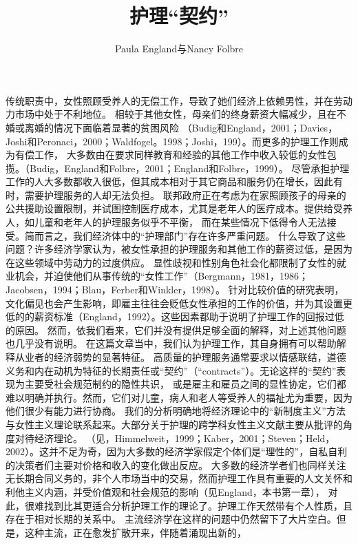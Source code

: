 \documentclass[UTF8]{ctexart}
\title{护理“契约”}
\author{Paula England与Nancy Folbre}
\begin{document}
\maketitle

传统职责中，女性照顾受养人的无偿工作，导致了她们经济上依赖男性，并在劳动力市场中处于不利地位。
相较于其他女性，母亲们的终身薪资大幅减少，且在不婚或离婚的情况下面临着显著的贫困风险
（Budig和Engl\newline and，2001；Davies，Joshi和Peronaci，2000；Waldfogel。1998；Joshi，199）。而更多的护理工作则成为有偿工作，
大多数由在要求同样教育和经验的其他工作中收入较低的女性包揽。（Budig，England和Folbre，2001；England和Folbre，1999）。
尽管承担护理工作的人大多数都收入很低，但其成本相对于其它商品和服务仍在增长，因此有时，需要护理服务的人却无法负担。
联邦政府正在考虑为在家照顾孩子的母亲的公共援助设置限制，并试图控制医疗成本，尤其是老年人的医疗成本。提供给受养人，如儿童和老年人的护理服务似乎不平衡，
而在某些情况下低得令人无法接受。简而言之，我们经济体中的“护理部门”存在许多严重问题。
什么导致了这些问题？许多经济学家认为，被女性承担的护理服务和其他工作的薪资过低，是因为在这些领域中劳动力的过度供应。
显性歧视和性别角色社会化都限制了女性的就业机会，并迫使他们从事传统的“女性工作”（Bergmann，1981，1986；Jacobsen，1994；Blau，Ferber和Winkler，1998）。
针对比较价值的研究表明，文化偏见也会产生影响，即雇主往往会贬低女性承担的工作的价值，并为其设置更低的的薪资标准（England，1992）。这些因素都助于说明了护理工作的回报过低的原因。
然而，依我们看来，它们并没有提供足够全面的解释，对上述其他问题也几乎没有说明。
在这篇文章当中，我们认为护理工作，其自身拥有可以帮助解释从业者的经济弱势的显著特征。
高质量的护理服务通常要求以情感联结，道德义务和内在动机为特征的长期责任或“契约”（“contracts”）。无论这样的“契约”表现为主要受社会规范制约的隐性共识，
或是雇主和雇员之间的显性协定，它们都难以明确并执行。然而，它们对儿童，病人和老人等受养人的福祉尤为重要，因为他们很少有能力进行协商。
我们的分析明确地将经济理论中的“新制度主义”方法与女性主义理论联系起来。大部分关于护理的跨学科女性主义文献主要从批评的角度对待经济理论。
（见，Himmelweit，1999；Kaber，2001；Steven；Held，2002）。这并不足为奇，因为大多数的经济学家假定个体们是“理性的”，自私自利的决策者们主要对价格和收入的变化做出反应。
大多数的经济学者们也同样关注无长期合同义务的，非个人市场当中的交易，然而护理工作具有重要的人文关怀和利他主义内涵，并受价值观和社会规范的影响（见England，本书第一章），
对此，很难找到比其更适合分析护理工作的理论了。护理工作天然带有个人性质，且存在于相对长期的关系中。
主流经济学在这样的问题中仍然留下了大片空白。但是，这种主流，正在愈发扩散开来，伴随着涌现出新的，
\end{document}
